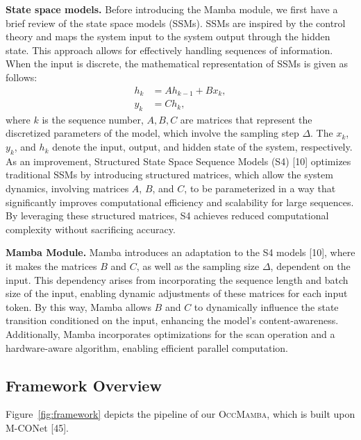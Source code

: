 \documentclass[10pt,twocolumn,letterpaper]{article}
\newcommand{\methodname}{\textsc{OccMamba}}
\begin{document}
\textbf{State space models.}
Before introducing the Mamba module, we first have a brief review of the state space models (SSMs). SSMs are inspired by the control theory and maps the system input to the system output through the hidden state. This approach allows for effectively handling sequences of information. When the input is discrete, the mathematical representation of SSMs is given as follows:
\begin{align}
  h_k &= A h_{k-1} + B x_k, \label{eq:ssm1} \\
  y_k &= C h_k, \label{eq:ssm2}
\end{align}
where $k$ is the sequence number, $A, B, C$ are matrices that represent the discretized parameters of the model, which involve the sampling step $\Delta$. The $x_k$, $y_k$, and $h_k$ denote the input, output, and hidden state of the system, respectively. As an improvement, Structured State Space Sequence Models (S4) [10] optimizes traditional SSMs by introducing structured matrices, which allow the system dynamics, involving matrices $A$, $B$, and $C$, to be parameterized in a way that significantly improves computational efficiency and scalability for large sequences. By leveraging these structured matrices, S4 achieves reduced computational complexity without sacrificing accuracy.

\textbf{Mamba Module.}
Mamba introduces an adaptation to the S4 models [10], where it makes the matrices $B$ and $C$, as well as the sampling size $\Delta$, dependent on the input. This dependency arises from incorporating the sequence length and batch size of the input, enabling dynamic adjustments of these matrices for each input token. By this way, Mamba allows $B$ and $C$ to dynamically influence the state transition conditioned on the input, enhancing the model's content-awareness. Additionally, Mamba incorporates optimizations for the scan operation and a hardware-aware algorithm, enabling efficient parallel computation.

\subsection{Framework Overview}
\label{sec:framework}

Figure~\ref{fig:framework} depicts the pipeline of our \methodname{}, which is built upon M-CONet [45].
\end{document}
